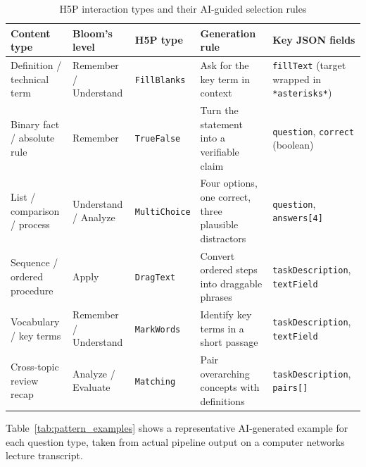 \begin{table}[H]
  \centering
  \small
  \begin{tabularx}{\linewidth}{
    >{\raggedright\arraybackslash}p{2.8cm}
    >{\raggedright\arraybackslash}p{2.2cm}
    >{\raggedright\arraybackslash}p{2.4cm}
    >{\raggedright\arraybackslash}X
    >{\raggedright\arraybackslash}X}
    \toprule
    \textbf{Content type} & \textbf{Bloom's level} & \textbf{H5P type} & \textbf{Generation rule} & \textbf{Key JSON fields} \\
    \midrule
    Definition / technical term  & Remember / Understand  & \texttt{FillBlanks}  & Ask for the key term in context & \texttt{fillText} (target wrapped in \texttt{*asterisks*}) \\
    \addlinespace
    Binary fact / absolute rule  & Remember  & \texttt{TrueFalse}   & Turn the statement into a verifiable claim & \texttt{question}, \texttt{correct} (boolean) \\
    \addlinespace
    List / comparison / process  & Understand / Analyze  & \texttt{MultiChoice} & Four options, one correct, three plausible distractors & \texttt{question}, \texttt{answers[4]} \\
    \addlinespace
    Sequence / ordered procedure & Apply  & \texttt{DragText}    & Convert ordered steps into draggable phrases & \texttt{taskDescription}, \texttt{textField} \\
    \addlinespace
    Vocabulary / key terms       & Remember / Understand  & \texttt{MarkWords}   & Identify key terms in a short passage & \texttt{taskDescription}, \texttt{textField} \\
    \addlinespace
    Cross-topic review recap     & Analyze / Evaluate  & \texttt{Matching}    & Pair overarching concepts with definitions & \texttt{taskDescription}, \texttt{pairs[]} \\
    \bottomrule
  \end{tabularx}
  \caption{H5P interaction types and their AI-guided selection rules}
  \label{tab:pattern_matrix}
\end{table}

Table~\ref{tab:pattern_examples} shows a representative AI-generated example for each question type, taken from actual pipeline output on a computer networks lecture transcript.

